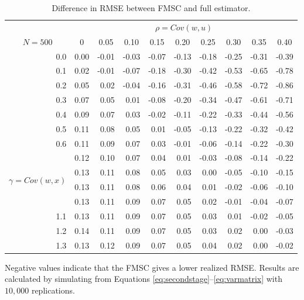 \documentclass[12pt]{article}
\theoremstyle{definition}
\begin{document}
%
\begin{table}[!tbp]
\caption{Difference in RMSE between FMSC and full estimator.}
\label{tab:rmsevsFULL}
\small
 \begin{center}
 \begin{tabular}{r|rrrrrrrrr}\hline\hline
&\multicolumn{9}{c}{$\rho = Cov(w,u)$}\\
\multicolumn{1}{c|}{$N = 500$}&\multicolumn{1}{c}{0}&\multicolumn{1}{c}{0.05}&\multicolumn{1}{c}{0.10}&\multicolumn{1}{c}{0.15}&\multicolumn{1}{c}{0.20}&\multicolumn{1}{c}{0.25}&\multicolumn{1}{c}{0.30}&\multicolumn{1}{c}{0.35}&\multicolumn{1}{c}{0.40}\tabularnewline
\hline
0.0&0.00&-0.01&-0.03&-0.07&-0.13&-0.18&-0.25&-0.31&-0.39\tabularnewline
0.1&0.02&-0.01&-0.07&-0.18&-0.30&-0.42&-0.53&-0.65&-0.78\tabularnewline
0.2&0.05& 0.02&-0.04&-0.16&-0.31&-0.46&-0.58&-0.72&-0.86\tabularnewline
0.3&0.07& 0.05& 0.01&-0.08&-0.20&-0.34&-0.47&-0.61&-0.71\tabularnewline
0.4&0.09& 0.07& 0.03&-0.02&-0.11&-0.22&-0.33&-0.44&-0.56\tabularnewline
0.5&0.11& 0.08& 0.05& 0.01&-0.05&-0.13&-0.22&-0.32&-0.42\tabularnewline
0.6&0.11& 0.09& 0.07& 0.03&-0.01&-0.06&-0.14&-0.22&-0.30\tabularnewline
\multirow{4}{5mm}{\begin{sideways}\parbox{1mm}{$\gamma\;$=$\;Cov(w,x)$}\end{sideways}}
0.7&0.12& 0.10& 0.07& 0.04& 0.01&-0.03&-0.08&-0.14&-0.22\tabularnewline
0.8&0.13& 0.11& 0.08& 0.05& 0.03& 0.00&-0.05&-0.10&-0.15\tabularnewline
0.9&0.13& 0.11& 0.08& 0.06& 0.04& 0.01&-0.02&-0.06&-0.10\tabularnewline
1.0&0.13& 0.11& 0.09& 0.07& 0.05& 0.02&-0.01&-0.04&-0.07\tabularnewline
1.1&0.13& 0.11& 0.09& 0.07& 0.05& 0.03& 0.01&-0.02&-0.05\tabularnewline
1.2&0.14& 0.11& 0.09& 0.07& 0.05& 0.03& 0.02& 0.00&-0.03\tabularnewline
1.3&0.13& 0.12& 0.09& 0.07& 0.05& 0.04& 0.02& 0.00&-0.02\tabularnewline
\hline
\end{tabular}
\end{center}
\footnotesize
\begin{tablenotes}
\item Negative values indicate that the FMSC gives a lower realized RMSE. Results are calculated by simulating from Equations \ref{eq:secondstage}--\ref{eq:varmatrix} with $10,000$ replications.
\end{tablenotes}
\end{table}
\end{document}
